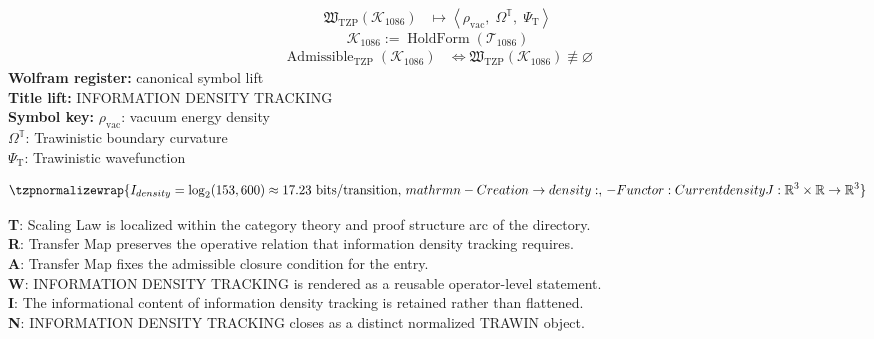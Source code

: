\noindent
\begin{minipage}[t]{0.48\linewidth}
\begingroup
\small
\[
\begin{aligned}
\mathfrak{W}_{\mathrm{TZP}}\!\left(\mathcal{K}_{1086}\right)
&\longmapsto
\left\langle \rho_{\mathrm{vac}},\; \Omega^{\mathbb{T}},\; \Psi_{\mathrm{T}} \right\rangle
\end{aligned}
\]
\[
\mathcal{K}_{1086}
:=
\operatorname{HoldForm}\!\left(\mathcal{T}_{1086}\right)
\]
\[
\begin{aligned}
\operatorname{Admissible}_{\mathrm{TZP}}\!\left(\mathcal{K}_{1086}\right)
&\Longleftrightarrow
\mathfrak{W}_{\mathrm{TZP}}\!\left(\mathcal{K}_{1086}\right)\not\equiv\varnothing
\end{aligned}
\]
\textbf{Wolfram register:} canonical symbol lift\\
\textbf{Title lift:} INFORMATION DENSITY TRACKING\\
\textbf{Symbol key:} \(\rho_{\mathrm{vac}}\): vacuum energy density\\ \(\Omega^{\mathbb{T}}\): Trawinistic boundary curvature\\ \(\Psi_{\mathrm{T}}\): Trawinistic wavefunction
\par
\endgroup
\end{minipage}\hfill
\begin{minipage}[t]{0.48\linewidth}
\[
\tzpnormalizewrap{I_{density} = \log_2(153,600) \approx 17.23 \text{ bits/transition},\,mathrm{n}- Creation \to density:,\,- Functor: Current density J : \mathbb{R}^{3}\times\mathbb{R} \to \mathbb{R}^{3}}
\]

\small
\textbf{T}: Scaling Law is localized within the category theory and proof structure arc of the directory.\\
\textbf{R}: Transfer Map preserves the operative relation that information density tracking requires.\\
\textbf{A}: Transfer Map fixes the admissible closure condition for the entry.\\
\textbf{W}: INFORMATION DENSITY TRACKING is rendered as a reusable operator-level statement.\\
\textbf{I}: The informational content of information density tracking is retained rather than flattened.\\
\textbf{N}: INFORMATION DENSITY TRACKING closes as a distinct normalized TRAWIN object.
\normalsize
\end{minipage}

